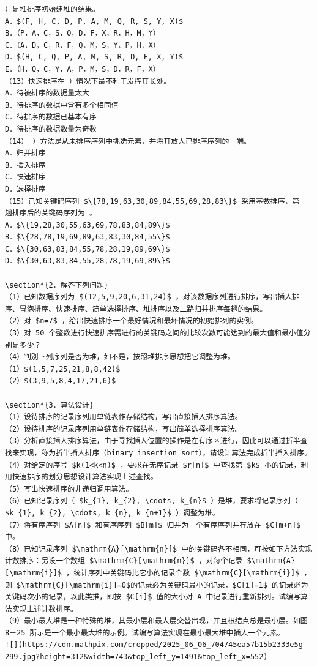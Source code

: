 \documentclass[10pt]{article}
\begin{document}
\begin{verbatim}
）是堆排序初始建堆的结果。
A．$(F, H, C, D, P, A, M, Q, R, S, Y, X)$
B．（P，A，C，S，Q，D，F，X，R，H，M，Y）
C．（A，D，C，R，F，Q，M，S，Y，P，H，X）
D．$(H, C, Q, P, A, M, S, R, D, F, X, Y)$
E．（H，Q，C，Y，A，P，M，S，D，R，F，X）
（13）快速排序在 ）情况下最不利于发挥其长处。
A．待被排序的数据量太大
B．待排序的数据中含有多个相同值
C．待排序的数据已基本有序
D．待排序的数据数量为奇数
（14） ）方法是从未排序序列中挑选元素，并将其放人已排序序列的一端。
A．归并排序
B．插入排序
C．快速排序
D．选择排序
（15）已知关键码序列 $\{78,19,63,30,89,84,55,69,28,83\}$ 采用基数排序，第一趟排序后的关键码序列为 。
A．$\{19,28,30,55,63,69,78,83,84,89\}$
B．$\{28,78,19,69,89,63,83,30,84,55\}$
C．$\{30,63,83,84,55,78,28,19,89,69\}$
D．$\{30,63,83,84,55,28,78,19,69,89\}$

\section*{2．解答下列问题}
（1）已知数据序列为 $(12,5,9,20,6,31,24)$ ，对该数据序列进行排序，写出插人排序、冒泡排序、快速排序、简单选择排序、堆排序以及二路归并排序每趟的结果。
（2）对 $n=7$ ，给出快速排序一个最好情况和最坏情况的初始排列的实例。
（3）对 50 个整数进行快速排序需进行的关键码之间的比较次数可能达到的最大值和最小值分别是多少？
（4）判别下列序列是否为堆，如不是，按照堆排序思想把它调整为堆。
（1）$(1,5,7,25,21,8,8,42)$
（2）$(3,9,5,8,4,17,21,6)$

\section*{3．算法设计}
（1）设待排序的记录序列用单链表作存储结构，写出直接插入排序算法。
（2）设待排序的记录序列用单链表作存储结构，写出简单选择排序算法。
（3）分析直接插人排序算法，由于寻找插人位置的操作是在有序区进行，因此可以通过折半查找来实现，称为折半插人排序（binary insertion sort），请设计算法完成折半插入排序。
（4）对给定的序号 $k(1<k<n)$ ，要求在无序记录 $r[n]$ 中查找第 $k$ 小的记录，利用快速排序的划分思想设计算法实现上述查找。
（5）写出快速排序的非递归调用算法。
（6）已知记录序列（ $k_{1}, k_{2}, \cdots, k_{n}$ ）是堆，要求将记录序列（ $k_{1}, k_{2}, \cdots, k_{n}, k_{n+1}$ ）调整为堆。
（7）将有序序列 $A[n]$ 和有序序列 $B[m]$ 归并为一个有序序列并存放在 $C[m+n]$ 中。
（8）已知记录序列 $\mathrm{A}[\mathrm{n}]$ 中的关键码各不相同，可按如下方法实现计数排序：另设一个数组 $\mathrm{C}[\mathrm{n}]$ ，对每个记录 $\mathrm{A}[\mathrm{i}]$ ，统计序列中关键码比它小的记录个数 $\mathrm{C}[\mathrm{i}]$ ，则 $\mathrm{C}[\mathrm{i}]=0$的记录必为关键码最小的记录，$C[i]=1$ 的记录必为关键码次小的记录，以此类推，即按 $C[i]$ 值的大小对 A 中记录进行重新排列。试编写算法实现上述计数排序。
（9）最小最大堆是一种特殊的堆，其最小层和最大层交替出现，并且根结点总是最小层。如图 8－25 所示是一个最小最大堆的示例。试编写算法实现在最小最大堆中插人一个元素。
![](https://cdn.mathpix.com/cropped/2025_06_06_704745ea57b15b2333e5g-299.jpg?height=312&width=743&top_left_y=1491&top_left_x=552)


\end{verbatim}
\end{document}
